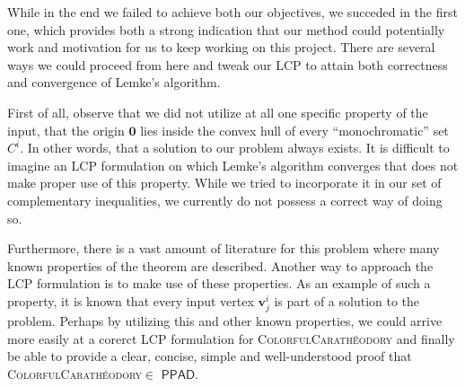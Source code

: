 \documentclass[a4paper,11pt]{article}
\def\cc#1{\mathsf{#1}}
\def\PPAD{\ensuremath{\cc{PPAD}}\xspace}
\def\problem#1{\textsc{#1}}
\def\org{\bm{0}}
\def\v{\textbf{v}}
\def\CCP{\problem{ColorfulCarath\'eodory}\xspace}
\begin{document}
\par While in the end we failed to achieve both our objectives, we succeded in the first one, which provides both a strong
indication that our method could potentially work and motivation for us to keep working on this project. There are several
ways we could proceed from here and tweak our LCP to attain both correctness and convergence of Lemke's algorithm.

\par First of all, observe that we did not utilize at all one specific property of the input, that the origin $\org$
lies inside the convex hull of every ``monochromatic'' set $C^i$. In other words, that a solution to our problem always
exists. It is difficult to imagine an LCP formulation on which Lemke's algorithm converges that does not make proper use
of this property. While we tried to incorporate it in our set of complementary inequalities, we currently do not possess
a correct way of doing so.

\par Furthermore, there is a vast amount of literature for this problem
\cite{Quad_solns, results_book, Comp_results, quad_solns_lbound} where many known properties of the theorem are described.
Another way to approach the LCP formulation is to make use of these properties. As an example of such a property, it is
known that every input vertex $\v^i_j$ is part of a solution to the problem. Perhaps by utilizing this and other known
properties, we could arrive more easily at a corerct LCP formulation for \CCP and finally be able to provide a clear,
concise, simple and well-understood proof that \CCP $\in$ \PPAD.




\end{document}
